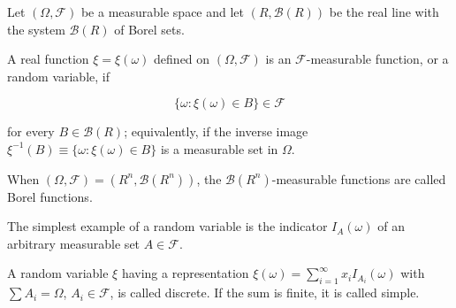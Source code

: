Let $(\Omega, \mathcal{F})$ be a measurable space and let $(R, \mathcal{B}(R))$ be the real line with the system $\mathcal{B}(R)$ of Borel sets.

A real function $\xi = \xi(\omega)$ defined on $(\Omega, \mathcal{F})$ is an $\mathcal{F}$-measurable function, or a random variable, if

$$\{\omega : \xi(\omega) \in B\} \in \mathcal{F}$$

for every $B \in \mathcal{B}(R)$; equivalently, if the inverse image $\xi^{-1}(B) \equiv \{\omega : \xi(\omega) \in B\}$ is a measurable set in $\Omega$.

When $(\Omega, \mathcal{F}) = (R^n, \mathcal{B}(R^n))$, the $\mathcal{B}(R^n)$-measurable functions are called Borel functions.

The simplest example of a random variable is the indicator $I_A(\omega)$ of an arbitrary measurable set $A \in \mathcal{F}$.

A random variable $\xi$ having a representation $\xi(\omega) = \sum_{i=1}^{\infty} x_i I_{A_i}(\omega)$ with $\sum A_i = \Omega$, $A_i \in \mathcal{F}$, is called discrete. If the sum is finite, it is called simple.
